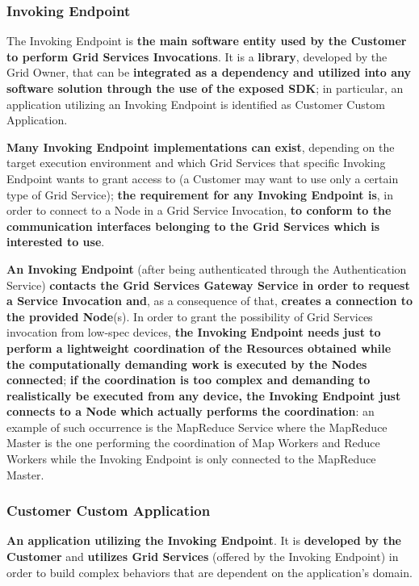 \subsubsection{Invoking Endpoint}
The Invoking Endpoint is \textbf{the main software entity used by the Customer to perform Grid Services Invocations}. It is a \textbf{library}, developed by the Grid Owner, that can be \textbf{integrated as a dependency and utilized into any software solution through the use of the exposed SDK}; in particular, an application utilizing an Invoking Endpoint is identified as Customer Custom Application.

\textbf{Many Invoking Endpoint implementations can exist}, depending on the target execution environment and which Grid Services that specific Invoking Endpoint wants to grant access to (a Customer may want to use only a certain type of Grid Service); \textbf{the requirement for any Invoking Endpoint is}, in order to connect to a Node in a Grid Service Invocation, \textbf{to conform to the communication interfaces belonging to the Grid Services which is interested to use}.

\textbf{An Invoking Endpoint} (after being authenticated through the Authentication Service) \textbf{contacts the Grid Services Gateway Service in order to request a Service Invocation and}, as a consequence of that, \textbf{creates a connection to the provided Node}(s). In order to grant the possibility of Grid Services invocation from low-spec devices, \textbf{the Invoking Endpoint needs just to perform a lightweight coordination of the Resources obtained while the computationally demanding work is executed by the Nodes connected}; \textbf{if the coordination is too complex and demanding to realistically be executed from any device, the Invoking Endpoint just connects to a Node which actually performs the coordination}: an example of such occurrence is the MapReduce Service where the MapReduce Master is the one performing the coordination of Map Workers and Reduce Workers while the Invoking Endpoint is only connected to the MapReduce Master.

\subsubsection{Customer Custom Application}
\textbf{An application utilizing the Invoking Endpoint}. It is \textbf{developed by the Customer} and \textbf{utilizes Grid Services} (offered by the Invoking Endpoint) in order to build complex behaviors that are dependent on the application's domain.

